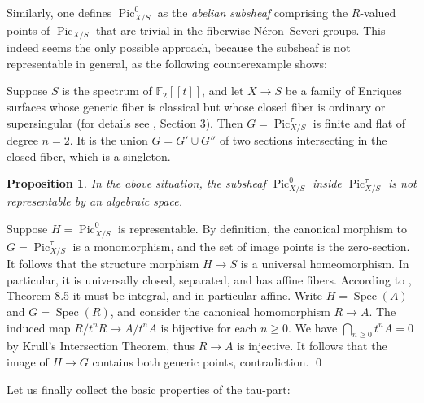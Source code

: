 \documentclass[oneside, 12pt]{amsart}
\newcommand\mylabel[1]{\label{#1}\marginpar{\raggedright\vspace{-1ex}\medskip\medskip\footnotesize \tt #1}}
\renewcommand\mylabel[1]{\label{#1}}
\newtheorem{proposition}[theorem]{Proposition}
\theoremstyle{definition}
\theoremstyle{remark}
\newcommand{\FF}{\mathbb{F}}
\newcommand{\Pic}{\operatorname{Pic}}
\newcommand{\ra}{\rightarrow}
\newcommand{\Spec}{\operatorname{Spec}}
\begin{document}
Similarly, one defines $\Pic^0_{X/S}$ as the \emph{abelian subsheaf} comprising the $R$-valued points of $\Pic_{X/S}$ that
are trivial in the fiberwise N\'eron--Severi groups. This indeed seems the only possible approach,
because the subsheaf is not representable in general, as the following counterexample shows:

Suppose $S$ is the spectrum of $\FF_2[[t]]$, 
and let $X\ra S$ be a family of Enriques surfaces whose generic fiber is classical but whose
closed fiber is ordinary or supersingular (for details see \cite{Bombieri; Mumford 1976}, Section 3). 
Then $G=\Pic_{X/S}^\tau$ is finite and flat of degree $n=2$. It is the union  $G=G'\cup G''$
of two sections  intersecting in the closed fiber, which is a singleton. 

\begin{proposition}
\mylabel{enriques counterexample}
In the above situation, the  subsheaf $\Pic^0_{X/S}$ inside $\Pic^\tau_{X/S}$ is not representable by an algebraic space.
\end{proposition}

\proof 
Suppose $H=\Pic^0_{X/S}$ is representable. By definition, the canonical morphism to $G=\Pic^\tau_{X/S}$
is a monomorphism, and the set of image points is the zero-section.
It follows that the structure morphism $H\ra S$ is a universal homeomorphism.
In particular, it is universally closed, separated, and has affine fibers.
According to \cite{Rydh 2015}, Theorem 8.5 it must be integral, and in particular affine. Write $H=\Spec(A)$
and $G=\Spec(R)$, and consider the canonical homomorphism $R\ra A$. 
The induced map $R/t^nR\ra A/t^nA$ is bijective for each $n\geq 0$. We have $\bigcap_{n\geq 0} t^nA=0$ by Krull's Intersection Theorem, thus $R\ra A $ is injective.
It follows that the image of $H\ra G$ contains both generic points, contradiction.
\qed

\medskip
Let us finally collect the basic properties of the tau-part:
\end{document}
